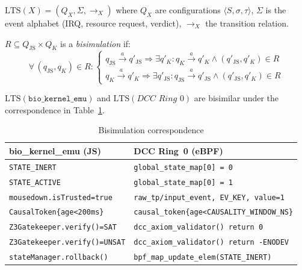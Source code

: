\documentclass[11pt,a4paper,twoside]{article}
\begin{document}
\begin{definition}[LTS]\label{def:lts}
$\mathrm{LTS}(X) = (Q_X, \Sigma, {\to_X})$ where $Q_X$ are configurations
$\langle S,\sigma,\tau\rangle$, $\Sigma$ is the event alphabet (IRQ, resource
request, verdict), ${\to_X}$ the transition relation.
\end{definition}

\begin{definition}[Bisimulation]\label{def:bisim}
$R \subseteq Q_\mathrm{JS} \times Q_K$ is a \emph{bisimulation} if:
\[
\forall\,(q_\mathrm{JS},q_K)\in R:\begin{cases}
  q_\mathrm{JS}\xrightarrow{a}q'_\mathrm{JS} \Rightarrow \exists q'_K: q_K\xrightarrow{a}q'_K \wedge (q'_\mathrm{JS},q'_K)\in R \\
  q_K\xrightarrow{a}q'_K \Rightarrow \exists q'_\mathrm{JS}: q_\mathrm{JS}\xrightarrow{a}q'_\mathrm{JS} \wedge (q'_\mathrm{JS},q'_K)\in R
\end{cases}
\]
\end{definition}

\begin{theorem}[Bisimulation]\label{thm:bisim}
$\mathrm{LTS}(\texttt{bio\_kernel\_emu})$ and $\mathrm{LTS}(\textit{DCC Ring~0})$
are bisimilar under the correspondence in Table~\ref{tab:bisim}.
\end{theorem}

\begin{table}[H]
\centering
\caption{Bisimulation correspondence\label{tab:bisim}}
\begin{tabular}{@{}ll@{}}
\toprule
\textbf{bio\_kernel\_emu (JS)} & \textbf{DCC Ring~0 (eBPF)} \\ \midrule
\texttt{STATE\_INERT}              & \texttt{global\_state\_map[0] = 0} \\
\texttt{STATE\_ACTIVE}             & \texttt{global\_state\_map[0] = 1} \\
\texttt{mousedown.isTrusted=true}  & \texttt{raw\_tp/input\_event, EV\_KEY, value=1} \\
\texttt{CausalToken\{age<200ms\}}  & \texttt{causal\_token\{age<CAUSALITY\_WINDOW\_NS\}} \\
\texttt{Z3Gatekeeper.verify()=SAT} & \texttt{dcc\_axiom\_validator() return 0} \\
\texttt{Z3Gatekeeper.verify()=UNSAT}& \texttt{dcc\_axiom\_validator() return -ENODEV} \\
\texttt{stateManager.rollback()}   & \texttt{bpf\_map\_update\_elem(STATE\_INERT)} \\
\bottomrule
\end{tabular}
\end{table}
\end{document}
